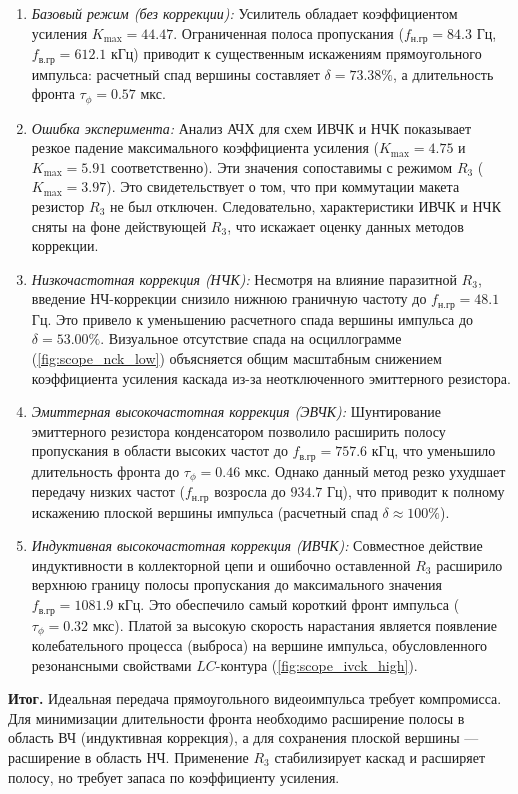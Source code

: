 \begin{enumerate}
    \item \textit{Базовый режим (без коррекции):} Усилитель обладает коэффициентом усиления $K_{\max} = 44.47$. Ограниченная полоса пропускания ($f_{\text{н.гр}} = 84.3$ Гц, $f_{\text{в.гр}} = 612.1$ кГц) приводит к существенным искажениям прямоугольного импульса: расчетный спад вершины составляет $\delta = 73.38\%$, а длительность фронта $\tau_{\phi} = 0.57$ мкс.

    \item \textit{Ошибка эксперимента:} Анализ АЧХ для схем ИВЧК и НЧК показывает резкое падение максимального коэффициента усиления ($K_{\max} = 4.75$ и $K_{\max} = 5.91$ соответственно). Эти значения сопоставимы с режимом $R_3$ ($K_{\max} = 3.97$). Это свидетельствует о том, что при коммутации макета резистор $R_3$ не был отключен. Следовательно, характеристики ИВЧК и НЧК сняты на фоне действующей $R_3$, что искажает оценку данных методов коррекции.

    \item \textit{Низкочастотная коррекция (НЧК):} Несмотря на влияние паразитной $R_3$, введение НЧ-коррекции снизило нижнюю граничную частоту до $f_{\text{н.гр}} = 48.1$ Гц. Это привело к уменьшению расчетного спада вершины импульса до $\delta = 53.00\%$. Визуальное отсутствие спада на осциллограмме (\cref{fig:scope_nck_low}) объясняется общим масштабным снижением коэффициента усиления каскада из-за неотключенного эмиттерного резистора.

    \item \textit{Эмиттерная высокочастотная коррекция (ЭВЧК):} Шунтирование эмиттерного резистора конденсатором позволило расширить полосу пропускания в области высоких частот до $f_{\text{в.гр}} = 757.6$ кГц, что уменьшило длительность фронта до $\tau_{\phi} = 0.46$ мкс. Однако данный метод резко ухудшает передачу низких частот ($f_{\text{н.гр}}$ возросла до $934.7$ Гц), что приводит к полному искажению плоской вершины импульса (расчетный спад $\delta \approx 100\%$).

    \item \textit{Индуктивная высокочастотная коррекция (ИВЧК):} Совместное действие индуктивности в коллекторной цепи и ошибочно оставленной $R_3$ расширило верхнюю границу полосы пропускания до максимального значения $f_{\text{в.гр}} = 1081.9$ кГц. Это обеспечило самый короткий фронт импульса ($\tau_{\phi} = 0.32$ мкс). Платой за высокую скорость нарастания является появление колебательного процесса (выброса) на вершине импульса, обусловленного резонансными свойствами $LC$-контура (\cref{fig:scope_ivck_high}).
\end{enumerate}

\textbf{Итог.} Идеальная передача прямоугольного видеоимпульса требует компромисса. Для минимизации длительности фронта необходимо расширение полосы в область ВЧ (индуктивная коррекция), а для сохранения плоской вершины — расширение в область НЧ. Применение $R_3$ стабилизирует каскад и расширяет полосу, но требует запаса по коэффициенту усиления.